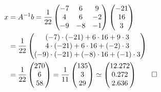 \begin{loesung}
\begin{teilaufgaben}
\begin{align*}
x&
=
A^{-1}b=
\frac1{22}
\begin{pmatrix}
-7&  6& 9\\
 4&  6&-2\\
-9&- 8&-1
\end{pmatrix}
\begin{pmatrix}
-21\\16\\3
\end{pmatrix}
\\
&=
\frac1{22}
\begin{pmatrix}
(-7)\cdot(-21)+6\cdot 16+9\cdot 3\\
4\cdot (-21)+ 6\cdot 16+ (-2)\cdot 3\\
(-9)\cdot(-21)+ (-8)\cdot 16+ (-1)\cdot 3
\end{pmatrix}
\\
&
=
\frac1{22}
\begin{pmatrix}
270\\
6\\
58
\end{pmatrix}
=
\frac1{11}
\begin{pmatrix}
135\\
3\\
29
\end{pmatrix}
\simeq
\begin{pmatrix}
   12.272\\
    0.272\\
    2.636
\end{pmatrix}
\qedhere
\end{align*}
\end{teilaufgaben}
\end{loesung}
